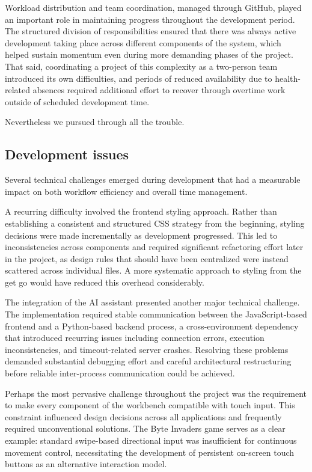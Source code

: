 \documentclass[a4paper,12pt]{article}
\begin{document}
Workload distribution and team coordination, managed through GitHub\cite{repo}\cite{github}, played an important role in maintaining progress throughout the development period. 
The structured division of responsibilities ensured that there was always active development taking place across different components of the system, which helped sustain momentum even during more demanding phases of the project. 
That said, coordinating a project of this complexity as a two-person team introduced its own difficulties, and periods of reduced availability due to health-related absences required additional effort to recover through overtime work outside of scheduled development time.

Nevertheless we pursued through all the trouble.
\newpage
\subsection{Development issues}
Several technical challenges emerged during development that had a measurable impact on both workflow efficiency and overall time management.

A recurring difficulty involved the frontend styling approach. 
Rather than establishing a consistent and structured CSS strategy from the beginning, styling decisions were made incrementally as development progressed. 
This led to inconsistencies across components and required significant refactoring effort later in the project, as design rules that should have been centralized were instead scattered across individual files. 
A more systematic approach to styling from the get go would have reduced this overhead considerably.

The integration of the AI assistant presented another major technical challenge. The implementation required stable communication between the JavaScript-based frontend and a Python-based backend process, a cross-environment dependency that introduced recurring issues including connection errors, execution inconsistencies, and timeout-related server crashes. Resolving these problems demanded substantial debugging effort and careful architectural restructuring before reliable inter-process communication could be achieved.

Perhaps the most pervasive challenge throughout the project was the requirement to make every component of the workbench compatible with touch input. 
This constraint influenced design decisions across all applications and frequently required unconventional solutions. 
The Byte Invaders game serves as a clear example: standard swipe-based directional input was insufficient for continuous movement control, necessitating the development of persistent on-screen touch buttons as an alternative interaction model. 
\end{document}
